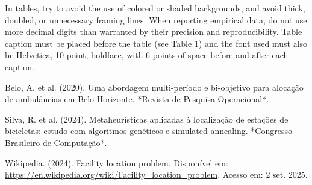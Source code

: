 \documentclass[12pt]{article}
\begin{document}
In tables, try to avoid the use of colored or shaded backgrounds, and avoid
thick, doubled, or unnecessary framing lines. When reporting empirical data,
do not use more decimal digits than warranted by their precision and
reproducibility. Table caption must be placed before the table (see Table 1)
and the font used must also be Helvetica, 10 point, boldface, with 6 points of
space before and after each caption.



\begin{thebibliography}{99}

 Belo, A. et al. (2020). Uma abordagem multi-período e bi-objetivo para alocação de ambulâncias em Belo Horizonte. *Revista de Pesquisa Operacional*.

 Silva, R. et al. (2024). Metaheurísticas aplicadas à localização de estações de bicicletas: estudo com algoritmos genéticos e simulated annealing. *Congresso Brasileiro de Computação*.

 Wikipedia. (2024). Facility location problem. Disponível em: \url{https://en.wikipedia.org/wiki/Facility_location_problem}. Acesso em: 2 set. 2025.

\end{thebibliography}
\end{document}

